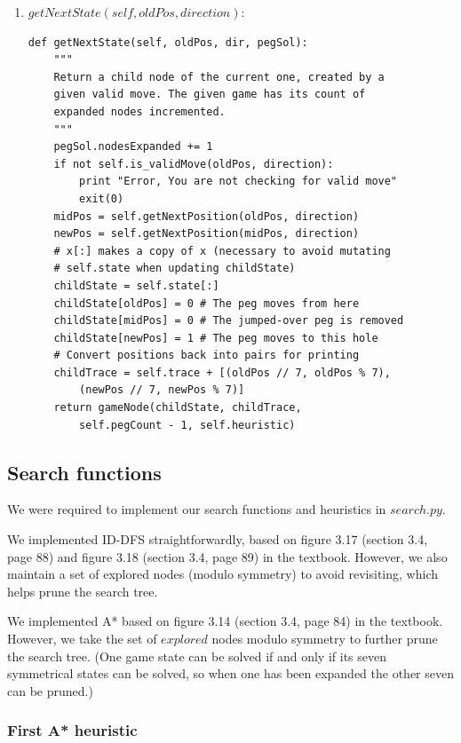 \documentclass[11pt]{article}
\begin{document}
\begin{enumerate}
\item \(getNextState(self, oldPos, direction)\):

\lstset{language=Python}
\begin{lstlisting}[frame=single]
def getNextState(self, oldPos, dir, pegSol):
	"""
	Return a child node of the current one, created by a
	given valid move. The given game has its count of
	expanded nodes incremented.
	"""
	pegSol.nodesExpanded += 1
	if not self.is_validMove(oldPos, direction):
		print "Error, You are not checking for valid move"
		exit(0)
	midPos = self.getNextPosition(oldPos, direction)
	newPos = self.getNextPosition(midPos, direction)
	# x[:] makes a copy of x (necessary to avoid mutating
	# self.state when updating childState)
	childState = self.state[:]
	childState[oldPos] = 0 # The peg moves from here
	childState[midPos] = 0 # The jumped-over peg is removed
	childState[newPos] = 1 # The peg moves to this hole
	# Convert positions back into pairs for printing
	childTrace = self.trace + [(oldPos // 7, oldPos % 7),
		(newPos // 7, newPos % 7)]
	return gameNode(childState, childTrace,
		self.pegCount - 1, self.heuristic)
\end{lstlisting}

\end{enumerate}

\subsection{Search functions}

We were required to implement our search functions and heuristics in
\(search.py\).

We implemented ID-DFS straightforwardly, based on figure 3.17 (section 3.4,
page 88) and figure 3.18 (section 3.4, page 89) in the textbook. However, we
also maintain a set of explored nodes (modulo symmetry) to avoid revisiting,
which helps prune the search tree.

We implemented A* based on figure 3.14 (section 3.4, page 84) in the textbook.
However, we take the set of \(explored\) nodes modulo symmetry to further prune
the search tree. (One game state can be solved if and only if its seven
symmetrical states can be solved, so when one has been expanded the other
seven can be pruned.)

\subsubsection{First A* heuristic}
\end{document}
